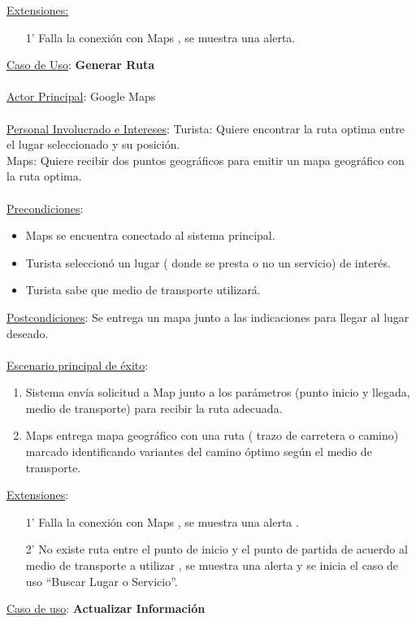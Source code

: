 \documentclass[12pt]{article}
\begin{document}
\underline{Extensiones:}
\begin{itemize}
\item[1'] Falla la conexión con Maps , se muestra una alerta.
\end{itemize}
\underline{Caso de Uso}: \textbf{Generar Ruta}\\\\
\underline{Actor Principal}: Google Maps\\\\
\underline{Personal Involucrado e Intereses}: Turista: Quiere encontrar la ruta optima entre el lugar seleccionado y su posición.\\Maps: Quiere recibir dos puntos geográficos para emitir un mapa geográfico con la ruta optima.\\\\
\underline{Precondiciones}:
\begin{itemize}
\item Maps se encuentra conectado al sistema principal.
\item Turista seleccionó un lugar ( donde se presta o no un servicio) de interés.
\item Turista sabe que medio de transporte utilizará.
\end{itemize}
\underline{Postcondiciones}: Se entrega un mapa junto a las indicaciones para llegar al lugar deseado.\\\\
\underline{Escenario principal de éxito}:
\begin{enumerate}
\item Sistema envía solicitud a Map junto a los parámetros (punto inicio y llegada, medio de transporte) para recibir la ruta adecuada.
\item Maps entrega mapa geográfico con una ruta ( trazo de carretera o camino) marcado identificando variantes del camino óptimo según el medio de transporte.
\end{enumerate}
\underline{Extensiones}:
\begin{enumerate}
\item[1'] Falla la conexión con Maps , se muestra una alerta .
\item[2'] No existe ruta entre el punto de inicio y el punto de partida de acuerdo al medio de transporte a utilizar , se muestra una alerta y se inicia el caso de uso “Buscar Lugar o Servicio”.
\end{enumerate}
\underline{Caso de uso}: \textbf{Actualizar Información}\\\\
\end{document}
